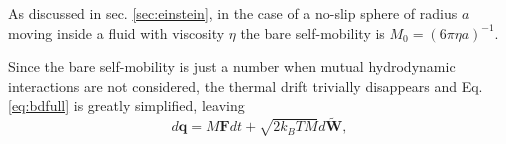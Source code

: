 \documentclass[ twoside,openright,titlepage,numbers=noenddot,%
headinclude,footinclude,cleardoublepage=empty,abstract=on,
BCOR=5mm,paper=b5,fontsize=11pt, dvipsnames
]{scrreprt}
\renewcommand{\vec}[1]{\bm{#1}}
\newcommand{\dt}{\delta t}
\newcommand{\kT}{k_B T}
\newcommand{\noise}{\widetilde{W}}
\newcommand{\ppos}{q}
\begin{document}
As discussed in sec. \ref{sec:einstein}, in the case of a no-slip sphere of radius $a$ moving inside a fluid with viscosity $\eta$ the bare self-mobility is $M_0 = (6\pi\eta a)^{-1}$.

Since the bare self-mobility is just a number when mutual hydrodynamic interactions are not considered, the thermal drift trivially disappears and Eq. \eqref{eq:bdfull} is greatly simplified, leaving
\begin{equation}
  \label{eq:bd}
  d\vec{\ppos} = M\vec{F}dt + \sqrt{2\kT M}d\vec{\noise},
\end{equation}


\end{document}

